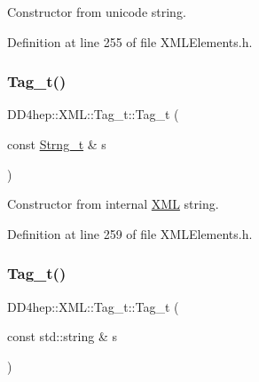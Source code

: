 Constructor from unicode string. 



Definition at line 255 of file X\+M\+L\+Elements.\+h.

\hypertarget{class_d_d4hep_1_1_x_m_l_1_1_tag__t_a9c6f70c4676068b78dd2d4e594d85162}{}\label{class_d_d4hep_1_1_x_m_l_1_1_tag__t_a9c6f70c4676068b78dd2d4e594d85162} 
\subsubsection{\texorpdfstring{Tag\+\_\+t()}{Tag\_t()}\hspace{0.1cm}{\footnotesize\ttfamily [3/6]}}
{\footnotesize\ttfamily D\+D4hep\+::\+X\+M\+L\+::\+Tag\+\_\+t\+::\+Tag\+\_\+t (\begin{DoxyParamCaption}\item[{const \hyperlink{class_d_d4hep_1_1_x_m_l_1_1_strng__t}{Strng\+\_\+t} \&}]{s }\end{DoxyParamCaption})\hspace{0.3cm}{\ttfamily [inline]}}



Constructor from internal \hyperlink{namespace_d_d4hep_1_1_x_m_l}{X\+ML} string. 



Definition at line 259 of file X\+M\+L\+Elements.\+h.

\hypertarget{class_d_d4hep_1_1_x_m_l_1_1_tag__t_a1b57625b6abcc2e563bf55b5e69f5877}{}\label{class_d_d4hep_1_1_x_m_l_1_1_tag__t_a1b57625b6abcc2e563bf55b5e69f5877} 
\subsubsection{\texorpdfstring{Tag\+\_\+t()}{Tag\_t()}\hspace{0.1cm}{\footnotesize\ttfamily [4/6]}}
{\footnotesize\ttfamily D\+D4hep\+::\+X\+M\+L\+::\+Tag\+\_\+t\+::\+Tag\+\_\+t (\begin{DoxyParamCaption}\item[{const std\+::string \&}]{s }\end{DoxyParamCaption})\hspace{0.3cm}{\ttfamily [inline]}}



